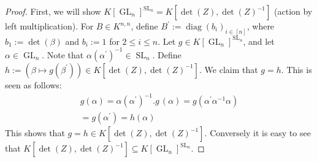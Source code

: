 \begin{proof}
  First, we will show $ K \left\lbrack \operatorname{GL}_n \right\rbrack ^{\operatorname{SL}_n} = K \left\lbrack \operatorname{det} (Z) , \operatorname{det} (Z) ^{-1} \right\rbrack $ (action by left multiplication).
  For $B \in K^{n,n}$, define $B^\prime := \operatorname{diag}(b_i)_{i\in[n]}$, where $b_1 := \operatorname{det}(\beta)$ and $b_i := 1$ for $2\leq i\leq n$.
  Let $g \in K \left\lbrack \operatorname{GL}_n \right\rbrack ^{ \operatorname{SL}_n }$, and let $ \alpha \in \operatorname{GL}_n $.
  Note that $\alpha (\alpha^\prime)^{-1} \in \operatorname{SL}_n$.
  Define $ h := \left( \beta \mapsto g \left(\beta^\prime \right) \right) \in K \left\lbrack \operatorname{det} (Z) , \operatorname{det} (Z) ^{-1} \right\rbrack $.
  We claim that $g = h$.
  This is seen as follows:
  \begin{equation}
    \begin{aligned}
      g ( \alpha )
      = \alpha (\alpha^\prime)^{-1} . g \, (\alpha)
      = g \left( \alpha^\prime \alpha ^{-1} \alpha \right) \\
      = g \left( \alpha^\prime \right)
      = h (\alpha)
    \end{aligned}
  \end{equation}
  This shows that $ g = h \in K \left\lbrack \operatorname{det} (Z) , \operatorname{det} (Z) ^{-1} \right\rbrack $.
  Conversely it is easy to see that $ K \left\lbrack \operatorname{det} (Z) , \operatorname{det} (Z) ^{-1} \right\rbrack \subseteq K \left\lbrack \operatorname{GL}_n \right\rbrack ^{\operatorname{SL}_n } $.


\end{proof}
